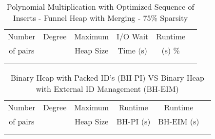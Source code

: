 \documentclass[11pt, one-sided]{amsart}
\begin{document}
\begin{table}[htbp]
   \centering
      \caption{Polynomial Multiplication with Optimized Sequence of Inserts - Funnel Heap with Merging - 75\% Sparsity}
   \begin{tabular}{|c|c|c|c|c|c|}
   	\hline
		 Number   & 	Degree	& Maximum & I/O Wait		& Runtime 	 \\ 
		 of pairs 	&			& Heap Size	& Time (s)		&	(s)		 		\%				\\ \hline
		 		&			&			&			&						\\
		 		&			&			&			&						\\
   \end{tabular}
   \label{tab:booktabs}
\end{table}



\newpage
{}

\begin{table}[htbp]
   \centering
      \caption{Binary Heap with Packed ID's (BH-PI) VS Binary Heap with External ID Management (BH-EIM)}
   \begin{tabular}{|c|c|c|c|c|c|}
   	\hline
		 Number   & 	Degree	& Maximum 	& Runtime	& Runtime 		 \\ 
		 of pairs 	&			& Heap Size	& BH-PI (s)	& BH-EIM (s)		\\ \hline
		 		&			&			&			&				\\
		 		&			&			&			&				\\
   \end{tabular}
   \label{tab:booktabs}
\end{table}




\newpage


\end{document}
